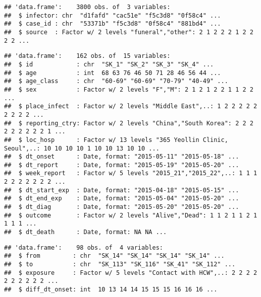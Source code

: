 \documentclass[9pt,a4paper,]{extarticle}
\newenvironment{Shaded}{\begin{snugshade}}{\end{snugshade}}
\newcommand{\KeywordTok}[1]{\textcolor[rgb]{0.13,0.29,0.53}{\textbf{#1}}}
\newcommand{\DecValTok}[1]{\textcolor[rgb]{0.00,0.00,0.81}{#1}}
\newcommand{\CommentTok}[1]{\textcolor[rgb]{0.56,0.35,0.01}{\textit{#1}}}
\newcommand{\OperatorTok}[1]{\textcolor[rgb]{0.81,0.36,0.00}{\textbf{#1}}}
\newcommand{\NormalTok}[1]{#1}
\theoremstyle{definition}
\theoremstyle{definition}
\theoremstyle{definition}
\theoremstyle{remark}
\begin{document}
\begin{verbatim}
## 'data.frame':    3800 obs. of  3 variables:
##  $ infector: chr  "d1fafd" "cac51e" "f5c3d8" "0f58c4" ...
##  $ case_id : chr  "53371b" "f5c3d8" "0f58c4" "881bd4" ...
##  $ source  : Factor w/ 2 levels "funeral","other": 2 1 2 2 2 1 2 2 2 2 ...
\end{verbatim}

\begin{Shaded}
\end{Shaded}

\begin{verbatim}
## 'data.frame':    162 obs. of  15 variables:
##  $ id            : chr  "SK_1" "SK_2" "SK_3" "SK_4" ...
##  $ age           : int  68 63 76 46 50 71 28 46 56 44 ...
##  $ age_class     : chr  "60-69" "60-69" "70-79" "40-49" ...
##  $ sex           : Factor w/ 2 levels "F","M": 2 1 2 1 2 2 1 1 2 2 ...
##  $ place_infect  : Factor w/ 2 levels "Middle East",..: 1 2 2 2 2 2 2 2 2 2 ...
##  $ reporting_ctry: Factor w/ 2 levels "China","South Korea": 2 2 2 2 2 2 2 2 2 1 ...
##  $ loc_hosp      : Factor w/ 13 levels "365 Yeollin Clinic, Seoul",..: 10 10 10 10 1 10 10 13 10 10 ...
##  $ dt_onset      : Date, format: "2015-05-11" "2015-05-18" ...
##  $ dt_report     : Date, format: "2015-05-19" "2015-05-20" ...
##  $ week_report   : Factor w/ 5 levels "2015_21","2015_22",..: 1 1 1 2 2 2 2 2 2 2 ...
##  $ dt_start_exp  : Date, format: "2015-04-18" "2015-05-15" ...
##  $ dt_end_exp    : Date, format: "2015-05-04" "2015-05-20" ...
##  $ dt_diag       : Date, format: "2015-05-20" "2015-05-20" ...
##  $ outcome       : Factor w/ 2 levels "Alive","Dead": 1 1 2 1 1 2 1 1 1 1 ...
##  $ dt_death      : Date, format: NA NA ...
\end{verbatim}

\begin{Shaded}
\end{Shaded}

\begin{verbatim}
## 'data.frame':    98 obs. of  4 variables:
##  $ from         : chr  "SK_14" "SK_14" "SK_14" "SK_14" ...
##  $ to           : chr  "SK_113" "SK_116" "SK_41" "SK_112" ...
##  $ exposure     : Factor w/ 5 levels "Contact with HCW",..: 2 2 2 2 2 2 2 2 2 2 ...
##  $ diff_dt_onset: int  10 13 14 14 15 15 15 16 16 16 ...
\end{verbatim}
\end{document}
